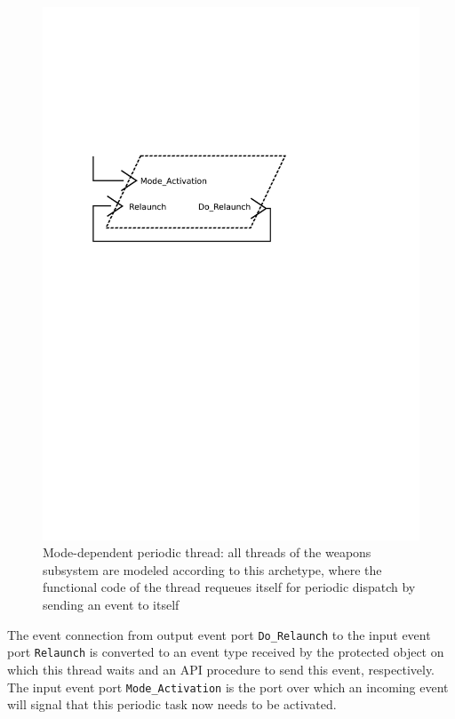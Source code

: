 \begin{figure}
\centering
\includegraphics[scale=0.5]{figs/mode_periodic}
\caption[Mode-dependent periodic thread.]{Mode-dependent periodic
  thread: {\normalsize all threads of the weapons subsystem are
    modeled according to this archetype, where the functional code of
    the thread requeues itself for periodic dispatch by sending an
    event to itself}}
\label{fig:mode_periodic}
\end{figure}

The event connection from output event port \texttt{Do\_Relaunch} to
the input event port \texttt{Relaunch} is converted to an event type
received by the protected object on which this thread waits and an API
procedure to send this event, respectively. The input event port
\texttt{Mode\_Activation} is the port over which an incoming event
will signal that this periodic task now needs to be activated.

